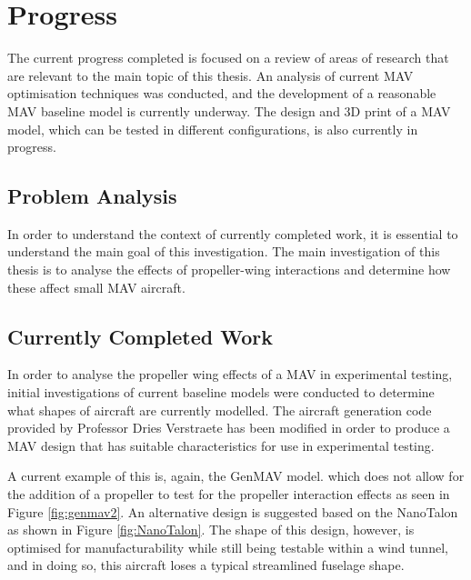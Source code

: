\graphicspath{{./Figs/}}

\chapter{Progress} 
The current progress completed is focused on a review of areas of research that are relevant to the main topic of this thesis. An analysis of current MAV optimisation techniques was conducted, and the development of a reasonable MAV baseline model is currently underway. The design and 3D print of a MAV model, which can be tested in different configurations, is also currently in progress. 

\section{Problem Analysis}
\label{sec: ProblemAnalysis}
In order to understand the context of currently completed work, it is essential to understand the main goal of this investigation. The main investigation of this thesis is to analyse the effects of propeller-wing interactions and determine how these affect small MAV aircraft. 

\section{Currently Completed Work}
\label{sec: completedWork}

In order to analyse the propeller wing effects of a MAV in experimental testing, initial investigations of current baseline models were conducted to determine what shapes of aircraft are currently modelled. The aircraft generation code provided by Professor Dries Verstraete has been modified in order to produce a MAV design that has suitable characteristics for use in experimental testing.

A current example of this is, again, the GenMAV model.
\cite{Stewart2007} which does not allow for the addition of a propeller to test for the propeller interaction effects as seen in Figure \ref{fig:genmav2}. An alternative design is suggested based on the NanoTalon as shown in Figure \ref{fig:NanoTalon}. The shape of this design, however, is optimised for manufacturability while still being testable within a wind tunnel, and in doing so, this aircraft loses a typical streamlined fuselage shape. 


